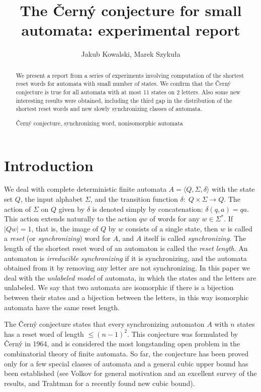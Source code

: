 \documentclass[runningheads,a4paper]{llncs}
\newcommand{\<}{\langle}
\renewcommand{\>}{\rangle}
\newcommand{\keywords}[1]{\par\addvspace\baselineskip
\noindent\keywordname\enspace\ignorespaces#1}
\begin{document}
\title{The \v{C}ern\'{y} conjecture for small automata: experimental report}
\author{Jakub Kowalski, Marek Szyku{\l}a}
\date{}
\maketitle

\begin{abstract}
We present a report from a series of experiments involving computation of the shortest reset words for automata with small number of states. We confirm that the \v{C}ern\'{y} conjecture is true for all automata with at most 11 states on 2 letters. Also some new interesting results were obtained, including the third gap in the distribution of the shortest reset words and new slowly synchronizing classes of automata.

\keywords{\v{C}ern\'{y} conjecture, synchronizing word, nonisomorphic automata}
\end{abstract}

\section{Introduction}
We deal with complete deterministic finite automata $A = \< Q,\Sigma,\delta \>$ with the state set $Q$, the input alphabet
$\Sigma$, and the transition function $\delta : \; Q \times \Sigma \to Q$. The action of $\Sigma$ on $Q$ given by $\delta$ is denoted simply by concatenation: $\delta(q,a) = qa$. This action extends naturally to the action $qw$ of words for any $w\in \Sigma^*$. If $|Qw|=1$, that is, the image of $Q$ by $w$ consists of a single state, then $w$ is called a \emph{reset} (or \emph{synchronizing}) word for $A$, and $A$ itself is called \emph{synchronizing}. The length of the shortest reset word of an automaton is called the \emph{reset length}. An automaton is \emph{irreducible synchronizing} if it is synchronizing, and the automata obtained from it by removing any letter are not synchronizing. In this paper we deal with the \emph{unlabeled model} of automata, in which the states and the letters are unlabeled. We say that two automata are isomorphic if there is a bijection between their states and a bijection between the letters, in this way isomorphic automata have the same reset length.

The \v{C}ern\'{y} conjecture states that every synchronizing automaton $A$ with $n$ states has a reset word of length $\leq (n-1)^2$. This conjecture was formulated by \v{C}ern\'{y} in 1964, and is considered the most longstanding open problem in the combinatorial theory of finite automata. So far, the conjecture has been proved only for a few special classes of automata and a general cubic upper bound has been established (see Volkov \cite{Vo2008} for general motivation and an excellent survey of the results, and Trahtman \cite{Tr2011} for a recently found new cubic bound).
\end{document}
